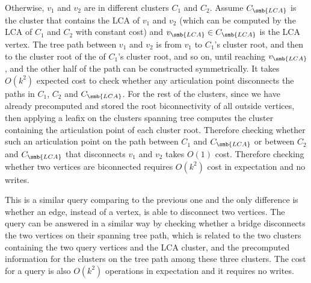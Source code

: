 Otherwise, $v_1$ and $v_2$ are in different clusters $C_1$ and $C_2$.  Assume $C_{\smb{LCA}}$ is the cluster that contains the LCA of $v_1$ and $v_2$ (which can be computed by the LCA of $C_1$ and $C_2$ with constant cost) and $v_{\smb{LCA}}\in C_{\smb{LCA}}$ is the LCA vertex.
The tree path between $v_1$ and $v_2$ is from $v_1$ to $C_1$'s cluster root, and then to the cluster root of the \outver{} of $C_1$'s cluster root, and so on, until reaching $v_{\smb{LCA}}$, and the other half of the path can be constructed symmetrically.  It takes $O(k^2)$ expected cost to check whether any articulation point disconnects the paths in $C_1$, $C_2$ and $C_{\smb{LCA}}$.
For the rest of the clusters, since we have already precomputed and stored the root biconnectivity of all outside vertices, then applying a leafix on the clusters spanning tree computes the cluster containing the articulation point of each cluster root.
Therefore checking whether such an articulation point on the path between $C_1$ and $C_{\smb{LCA}}$ or between $C_2$ and $C_{\smb{LCA}}$ that disconnects $v_1$ and $v_2$ takes $O(1)$ cost.  Therefore checking whether two vertices are biconnected requires $O(k^2)$ cost in expectation and no writes.


This is a similar query comparing to the previous one and the only difference is whether an edge, instead of a vertex, is able to disconnect two vertices.
The query can be answered in a similar way by checking whether a bridge disconnects the two vertices on their spanning tree path, which is related to the two clusters containing the two query vertices and the LCA cluster, and the precomputed information for the clusters on the tree path among these three clusters.
The cost for a query is also $O(k^2)$ operations in expectation and it requires no writes.

